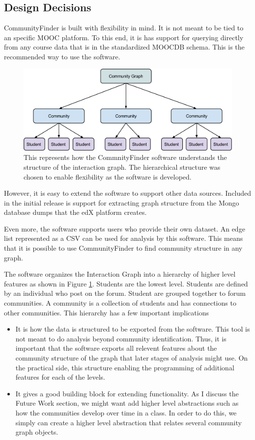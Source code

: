 \subsection{Design Decisions}
CommunityFinder is built with flexibility in mind. It is not meant to be tied to an specific MOOC platform. To this end, it is has support for querying directly from any course data that is in the standardized MOOCDB schema. This is the recommended way to use the software.

\begin{figure}[h]
 \centering
 \includegraphics[width=.8\linewidth]{design.png}
 \caption{This represents how the CommnityFinder software understands the structure of the interaction graph. The hierarchical structure was chosen to enable flexibility as the software is developed. }
 \label{design}
\end{figure}

However, it is easy to extend the software to support other data sources. Included in the initial release is support for extracting graph structure from the Mongo database dumps that the edX platform creates. 

Even more, the software supports users who provide their own dataset. An edge list represented as a CSV can be used for analysis by this software. This means that it is possible to use CommunityFinder to find community structure in any graph.

The software organizes the Interaction Graph into a hierarchy of higher level features as shown in Figure \ref{design}. Students are the lowest level. Students are defined by an individual who post on the forum. Student are grouped together to forum communities. A community is a collection of students and has connections to other communities. This hierarchy has a few important implications

\begin{itemize}
\item It is how the data is structured to be exported from the software. This tool is not meant to do analysis beyond community identification. Thus, it is important that the software exports all relevent features about the community structure of the graph that later stages of analysis might use. On the practical side, this structure enabling the programming of additional features for each of the levels. 

\item It gives a good building block for extending functionality. As I discuss the Future Work section, we might want add higher level abstractions such as how the communities develop over time in a class. In order to do this, we simply can create a higher level abstraction that relates several community graph objects.
\end{itemize}

